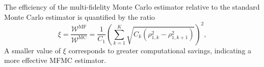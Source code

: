 
The efficiency of the multi-fidelity Monte Carlo estimator relative to the standard Monte Carlo estimator is quantified by the ratio
%
\begin{equation}\label{eq:MFMC_sampling_cost_efficiency}
    \xi = \frac{\mathcal{W}^\text{MF}}{\mathcal{W}^\text{MC}} = \frac{1}{C_1} \left(\sum_{k=1}^K\sqrt{C_k\left(\rho_{1,k}^2 - \rho_{1,k+1}^2\right)}\right)^2,
\end{equation}
%
A smaller value of $\xi$ corresponds to greater computational savings, indicating a more effective MFMC estimator.

